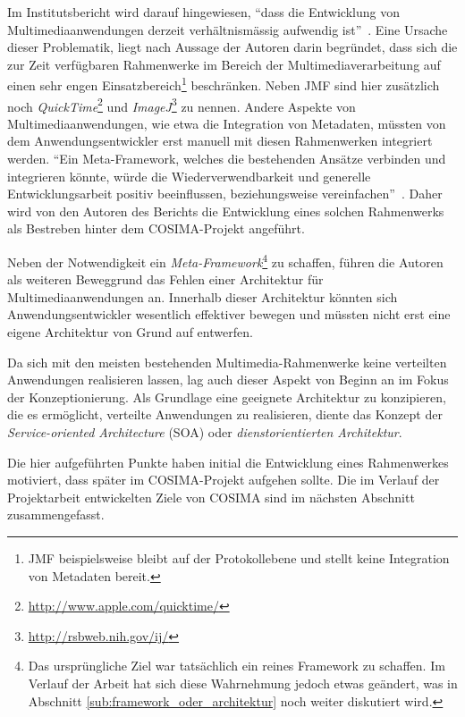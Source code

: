   Im Institutsbericht wird darauf hingewiesen, "`dass die Entwicklung von Multimediaanwendungen derzeit verhältnismässig aufwendig ist"'~\citep[S. 2]{bericht}. Eine Ursache dieser Problematik, liegt nach Aussage der Autoren darin begründet, dass sich die zur Zeit verfügbaren Rahmenwerke im Bereich der Multimediaverarbeitung auf einen sehr engen Einsatzbereich\footnote{JMF beispielsweise bleibt auf der Protokollebene und stellt keine Integration von Metadaten bereit.} beschränken. Neben JMF sind hier zusätzlich noch \emph{QuickTime}\footnote{\url{http://www.apple.com/quicktime/}} und \emph{ImageJ}\footnote{\url{http://rsbweb.nih.gov/ij/}} zu nennen. Andere Aspekte von Multimediaanwendungen, wie etwa die Integration von Metadaten, müssten von dem Anwendungsentwickler erst manuell mit diesen Rahmenwerken integriert werden. "`Ein Meta-Framework, welches die bestehenden Ansätze verbinden und integrieren könnte, würde die Wiederverwendbarkeit und generelle Entwicklungsarbeit positiv beeinflussen, beziehungsweise vereinfachen"'~\citep[S. 3]{bericht}. Daher wird von den Autoren des Berichts die Entwicklung eines solchen Rahmenwerks als Bestreben hinter dem COSIMA-Projekt angeführt.
  
  Neben der Notwendigkeit ein \emph{Meta-Framework}\footnote{Das ursprüngliche Ziel war tatsächlich ein reines Framework zu schaffen. Im Verlauf der Arbeit hat sich diese Wahrnehmung jedoch etwas geändert, was in Abschnitt \ref{sub:framework_oder_architektur} noch weiter diskutiert wird.} zu schaffen, führen die Autoren als weiteren Beweggrund das Fehlen einer Architektur für Multimediaanwendungen an. Innerhalb dieser Architektur könnten sich Anwendungsentwickler wesentlich effektiver bewegen und müssten nicht erst eine eigene Architektur von Grund auf entwerfen.
  
  Da sich mit den meisten bestehenden Multimedia-Rahmenwerke keine verteilten Anwendungen realisieren lassen, lag auch dieser Aspekt von Beginn an im Fokus der Konzeptionierung. Als Grundlage eine geeignete Architektur zu konzipieren, die es ermöglicht, verteilte Anwendungen zu realisieren, diente das Konzept der \emph{Service-oriented Architecture} (SOA) oder \emph{dienstorientierten Architektur}.
  
  Die hier aufgeführten Punkte haben initial die Entwicklung eines Rahmenwerkes motiviert, dass später im COSIMA-Projekt aufgehen sollte. Die im Verlauf der Projektarbeit entwickelten Ziele von COSIMA sind im nächsten Abschnitt zusammengefasst.

